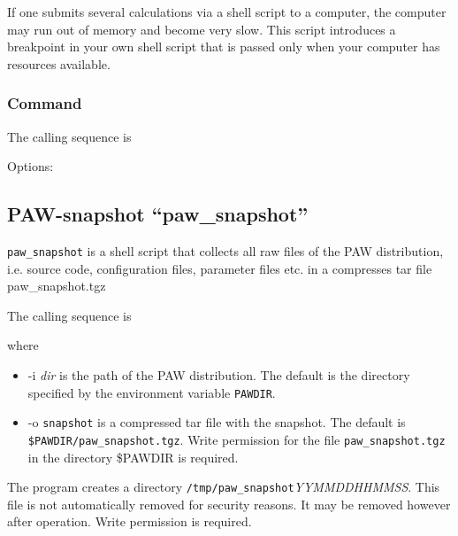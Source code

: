 \documentclass[final,12pt,makeidx,DIV=calc]{article}
\begin{document}
{{{If one submits several calculations via a shell script to a computer, the
computer may run out of memory and become very slow. This script
introduces a breakpoint in your own shell script that is passed only
when your computer has resources available.

\subsubsection{Command}
The calling sequence is

\bigskip{}
\vspace{0.5cm}

\noindent Options:\\[2mm]
\hspace*{1cm}

\subsection{PAW-snapshot ``paw\_snapshot''}
{\tt paw\_snapshot} is a shell script that collects all raw files of
the PAW distribution, i.e. source code, configuration files,
parameter files etc. in a compresses tar file paw\_snapshot.tgz

The calling sequence is

\bigskip{}
\bigskip

where 
\begin{itemize}
\item -i \textit{dir} is the path of the PAW distribution. The default
  is the directory specified by the environment variable
  \texttt{PAWDIR}.
\item -o \texttt{snapshot} is a compressed tar file with the
  snapshot. The default is \texttt{\$PAWDIR/paw\_snapshot.tgz}.  Write
  permission for the file \texttt{paw\_snapshot.tgz} in the directory
  \$PAWDIR is required.  
\end{itemize}
The program creates a directory
\texttt{/tmp/paw\_snapshot}\textit{YYMMDDHHMMSS}. This file is not
automatically removed for security reasons. It may be removed however
after operation. Write permission is required.


}}}
\end{document}
